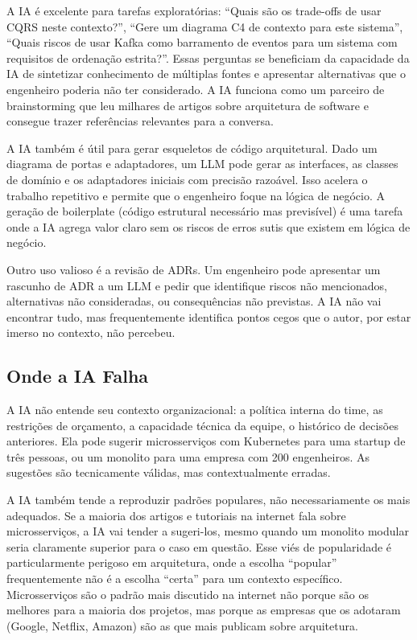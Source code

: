 A IA é excelente para tarefas exploratórias: ``Quais são os trade-offs de usar
CQRS neste contexto?'', ``Gere um diagrama C4 de contexto para este sistema'',
``Quais riscos de usar Kafka como barramento de eventos para um sistema com
requisitos de ordenação estrita?''. Essas perguntas se beneficiam da capacidade
da IA de sintetizar conhecimento de múltiplas fontes e apresentar alternativas
que o engenheiro poderia não ter considerado. A IA funciona como um parceiro
de brainstorming que leu milhares de artigos sobre arquitetura de software e
consegue trazer referências relevantes para a conversa.

A IA também é útil para gerar esqueletos de código arquitetural. Dado um diagrama
de portas e adaptadores, um LLM pode gerar as interfaces, as classes de domínio
e os adaptadores iniciais com precisão razoável. Isso acelera o trabalho
repetitivo e permite que o engenheiro foque na lógica de negócio. A geração de
boilerplate (código estrutural necessário mas previsível) é uma tarefa
onde a IA agrega valor claro sem os riscos de erros sutis que existem em lógica
de negócio.

Outro uso valioso é a revisão de ADRs. Um engenheiro pode apresentar um rascunho
de ADR a um LLM e pedir que identifique riscos não mencionados, alternativas não
consideradas, ou consequências não previstas. A IA não vai encontrar tudo, mas
frequentemente identifica pontos cegos que o autor, por estar imerso no
contexto, não percebeu.

\subsection{Onde a IA Falha}

A IA não entende seu contexto organizacional: a política interna do time, as
restrições de orçamento, a capacidade técnica da equipe, o histórico de
decisões anteriores. Ela pode sugerir microsserviços com Kubernetes para uma
startup de três pessoas, ou um monolito para uma empresa com 200 engenheiros.
As sugestões são tecnicamente válidas, mas contextualmente erradas.

A IA também tende a reproduzir padrões populares, não necessariamente os
mais adequados. Se a maioria dos artigos e tutoriais na internet fala sobre
microsserviços, a IA vai tender a sugeri-los, mesmo quando um monolito modular
seria claramente superior para o caso em questão. Esse viés de popularidade é
particularmente perigoso em arquitetura, onde a escolha ``popular'' frequentemente
não é a escolha ``certa'' para um contexto específico. Microsserviços são o
padrão mais discutido na internet não porque são os melhores para a maioria
dos projetos, mas porque as empresas que os adotaram (Google, Netflix, Amazon)
são as que mais publicam sobre arquitetura.

